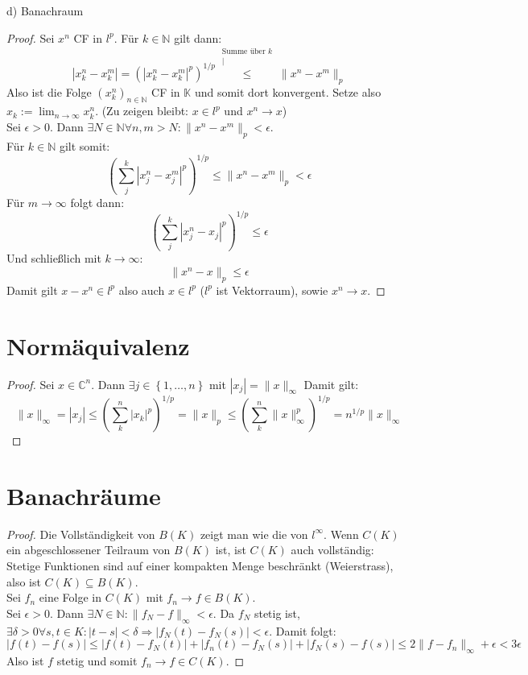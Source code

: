 \documentclass[a4paper,12pt]{article}
\newcommand{\kom}{}
\newcommand{\kla}{}
\newcommand{\klammer}{}
\begin{document}
d) Banachraum
\begin{proof}
Sei $x^n$ CF in $l^p$. Für $k\in\mathbb{N}$ gilt dann:
$$|x_k^n-x_k^m|=\kla\left( {|x_k^n-x_k^m|^p} \right)^{1/p}\kom\overset{\substack{{\text{Summe über }k} \\ |}}{\le}\|x^n-x^m\|_p$$
Also ist die Folge $(x_k^n)_{n\in\mathbb{N}}$ CF in $\mathbb{K}$ und somit dort konvergent. Setze also $x_k:=\lim_{n\rightarrow\infty}x_k^n$. (Zu zeigen bleibt: $x\in l^p$ und $x^n\rightarrow x$)\\
Sei $\epsilon >0$. Dann $\exists N\in\mathbb{N}\forall n,m>N:\|x^n-x^m\|_p<\epsilon$.\\
Für $k\in\mathbb{N}$ gilt somit:
$$\kla\left( {\sum_j^k|x_j^n-x_j^m|^p} \right)^{1/p}\le\|x^n-x^m\|_p<\epsilon$$
Für $m\rightarrow\infty$ folgt dann:
$$\kla\left( {\sum_j^k|x_j^n-x_j|^p} \right)^{1/p}\le\epsilon$$
Und schließlich mit $k\rightarrow\infty$:
$$\|x^n-x\|_p\le\epsilon$$
Damit gilt $x-x^n\in l^p$ also auch $x\in l^p$ ($l^p$ ist Vektorraum), sowie $x^n\rightarrow x$.
\end{proof}

\section{Normäquivalenz}
\begin{proof}
Sei $x\in\mathbb{C}^n$. Dann $\exists j\in\klammer\left\{ {1,\dots,n} \right\}$ mit $|x_j|=\|x\|_\infty$ Damit gilt:
$$\|x\|_\infty=|x_j|\le\kla\left( {\sum_k^n|x_k|^p} \right)^{1/p}=\|x\|_p\le\kla\left( {\sum_k^n\|x\|_\infty^p} \right)^{1/p}=n^{1/p}\|x\|_\infty$$
\end{proof}
\section{Banachräume}
\begin{proof}
Die Vollständigkeit von $B(K)$ zeigt man wie die von $l^\infty$.
Wenn $C(K)$ ein abgeschlossener Teilraum von $B(K)$ ist, ist $C(K)$ auch vollständig:\\
Stetige Funktionen sind auf einer kompakten Menge beschränkt (Weierstrass), also ist $C(K)\subseteq B(K)$. \\
Sei $f_n$ eine Folge in $C(K)$ mit $f_n\rightarrow f\in B(K)$. \\
Sei $\epsilon>0$. Dann $\exists N\in\mathbb{N}:\|f_N-f\|_\infty<\epsilon$. Da $f_N$ stetig ist, $\exists\delta >0\forall s,t\in K:|t-s|<\delta\Rightarrow |f_N(t)-f_N(s)|<\epsilon$. Damit folgt:
$$|f(t)-f(s)|\le |f(t)-f_N(t)|+|f_n(t)-f_N(s)|+|f_N(s)-f(s)|\le 2\|f-f_n\|_\infty+\epsilon <3\epsilon$$ 
Also ist $f$ stetig und somit $f_n\rightarrow f\in C(K)$.
\end{proof}
\end{document}
